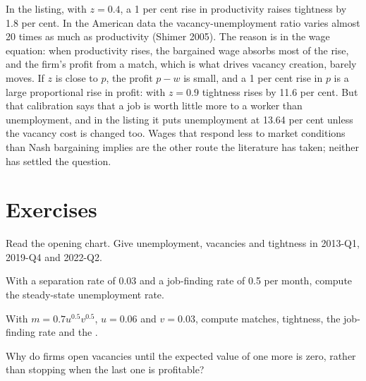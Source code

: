 In the listing, with $z = 0.4$, a 1 per cent rise in productivity raises tightness by 1.8 per cent. In the American data the
vacancy-unemployment ratio varies almost 20 times as much as productivity (Shimer 2005). The reason is in the wage equation:
when productivity rises, the bargained wage absorbs most of the rise, and the firm's profit from a match, which is what
drives vacancy creation, barely moves. If $z$ is close to $p$, the profit $p - w$ is small, and a 1 per cent rise in $p$ is a large proportional rise in profit: with $z = 0.9$
tightness rises by 11.6 per cent. But that calibration says that a job is worth little more to a worker than unemployment, and in
the listing it puts unemployment at 13.64 per cent unless the vacancy cost is changed too. Wages that respond less to market
conditions than Nash bargaining implies are the other route the literature has taken; neither has settled the question.

\section{Exercises}\label{sec:b2:search-and-unemployment:exercises}

\begin{exercise}[$\star$]\label{exo:b2:search-and-unemployment:1}
Read the opening chart. Give unemployment, vacancies and tightness in 2013-Q1, 2019-Q4 and 2022-Q2.
\end{exercise}

\begin{exercise}[$\star$]\label{exo:b2:search-and-unemployment:2}
With a separation rate of 0.03 and a job-finding rate of 0.5 per month, compute the steady-state unemployment rate.
\end{exercise}

\begin{exercise}[$\star$]\label{exo:b2:search-and-unemployment:3}
With $m = 0.7u^{0.5}v^{0.5}$, $u = 0.06$ and $v = 0.03$, compute matches, tightness, the job-finding rate and the .
\end{exercise}

\begin{exercise}[$\star$]\label{exo:b2:search-and-unemployment:4}
Why do firms open vacancies until the expected value of one more is zero, rather than stopping when the last one is
profitable?
\end{exercise}

